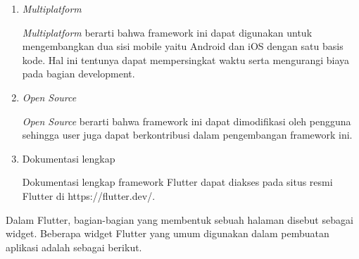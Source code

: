 \begin{enumerate}
	\item \textit{Multiplatform}
	
	\textit{Multiplatform} berarti bahwa framework ini dapat digunakan untuk mengembangkan dua sisi mobile yaitu Android dan iOS dengan satu basis kode. Hal ini tentunya dapat mempersingkat waktu serta mengurangi biaya pada bagian development.

	\item \textit{Open Source}
	
	\textit{Open Source} berarti bahwa framework ini dapat dimodifikasi oleh pengguna sehingga user juga dapat berkontribusi dalam pengembangan framework ini.

	\item Dokumentasi lengkap
	
	Dokumentasi lengkap framework Flutter dapat diakses pada situs resmi Flutter di https://flutter.dev/.
\end{enumerate}

Dalam Flutter, bagian-bagian yang membentuk sebuah halaman disebut sebagai widget. Beberapa widget Flutter yang umum digunakan dalam pembuatan aplikasi adalah sebagai berikut.

